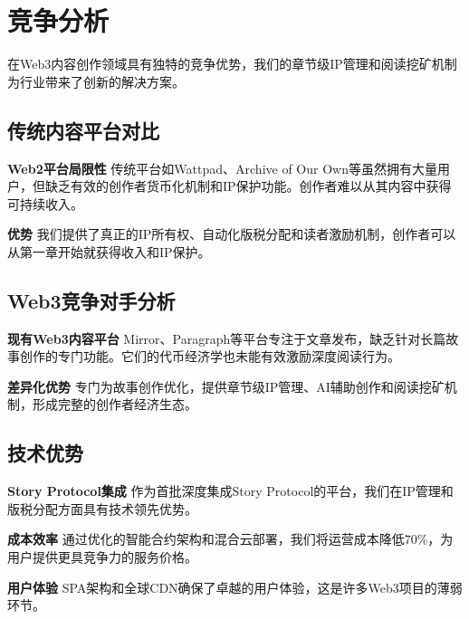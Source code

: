 \section{竞争分析}\label{sec:competitive-analysis-cn}

\storyhouse{}在Web3内容创作领域具有独特的竞争优势，我们的章节级IP管理和阅读挖矿机制为行业带来了创新的解决方案。

\subsection{传统内容平台对比}

\textbf{Web2平台局限性}
传统平台如Wattpad、Archive of Our Own等虽然拥有大量用户，但缺乏有效的创作者货币化机制和IP保护功能。创作者难以从其内容中获得可持续收入。

\textbf{\storyhouse{}优势}
我们提供了真正的IP所有权、自动化版税分配和读者激励机制，创作者可以从第一章开始就获得收入和IP保护。

\subsection{Web3竞争对手分析}

\textbf{现有Web3内容平台}
Mirror、Paragraph等平台专注于文章发布，缺乏针对长篇故事创作的专门功能。它们的代币经济学也未能有效激励深度阅读行为。

\textbf{差异化优势}
\storyhouse{}专门为故事创作优化，提供章节级IP管理、AI辅助创作和阅读挖矿机制，形成完整的创作者经济生态。

\subsection{技术优势}

\textbf{Story Protocol集成}
作为首批深度集成Story Protocol的平台，我们在IP管理和版税分配方面具有技术领先优势。

\textbf{成本效率}
通过优化的智能合约架构和混合云部署，我们将运营成本降低70\%，为用户提供更具竞争力的服务价格。

\textbf{用户体验}
SPA架构和全球CDN确保了卓越的用户体验，这是许多Web3项目的薄弱环节。